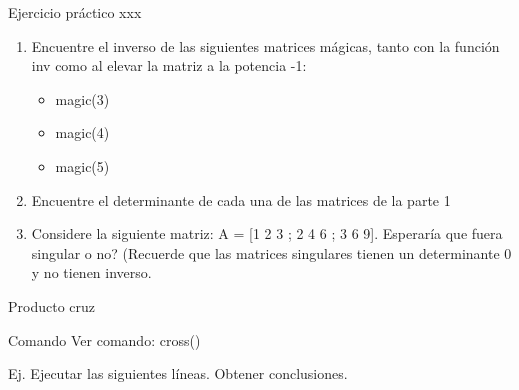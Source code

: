 \begin{frame}{Ejercicio práctico xxx}
\begin{enumerate}
\item Encuentre el inverso de las siguientes matrices mágicas, tanto con la función inv como al elevar la matriz a la potencia -1:
\begin{itemize}
\item magic(3)
\item magic(4)
\item magic(5)
\end{itemize}
\item Encuentre el determinante de cada una de las matrices de la parte 1
\item Considere la siguiente matriz: A = [1 2 3 ; 2 4 6 ; 3 6 9]. Esperaría que fuera singular o no? (Recuerde que las matrices singulares tienen un determinante 0 y no tienen inverso.
\end{enumerate}
\end{frame}

\begin{frame}{Producto cruz}
\begin{exampleblock}{Comando}
Ver comando: cross()
\end{exampleblock}
Ej. Ejecutar las siguientes líneas. Obtener conclusiones.
\end{frame}

